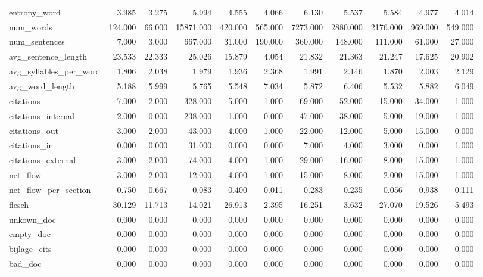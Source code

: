 \begin{tabular}{lrrrrrrrrrr}
\cline{1-11}
entropy\_word & 3.985 & 3.275 & 5.994 & 4.555 & 4.066 & 6.130 & 5.537 & 5.584 & 4.977 & 4.014 \\
\cline{1-11}
num\_words & 124.000 & 66.000 & 15871.000 & 420.000 & 565.000 & 7273.000 & 2880.000 & 2176.000 & 969.000 & 549.000 \\
\cline{1-11}
num\_sentences & 7.000 & 3.000 & 667.000 & 31.000 & 190.000 & 360.000 & 148.000 & 111.000 & 61.000 & 27.000 \\
\cline{1-11}
avg\_sentence\_length & 23.533 & 22.333 & 25.026 & 15.879 & 4.054 & 21.832 & 21.363 & 21.247 & 17.625 & 20.902 \\
\cline{1-11}
avg\_syllables\_per\_word & 1.806 & 2.038 & 1.979 & 1.936 & 2.368 & 1.991 & 2.146 & 1.870 & 2.003 & 2.129 \\
\cline{1-11}
avg\_word\_length & 5.188 & 5.999 & 5.765 & 5.548 & 7.034 & 5.872 & 6.406 & 5.532 & 5.882 & 6.049 \\
\cline{1-11}
citations & 7.000 & 2.000 & 328.000 & 5.000 & 1.000 & 69.000 & 52.000 & 15.000 & 34.000 & 1.000 \\
\cline{1-11}
citations\_internal & 2.000 & 0.000 & 238.000 & 1.000 & 0.000 & 47.000 & 38.000 & 5.000 & 19.000 & 1.000 \\
\cline{1-11}
citations\_out & 3.000 & 2.000 & 43.000 & 4.000 & 1.000 & 22.000 & 12.000 & 5.000 & 15.000 & 0.000 \\
\cline{1-11}
citations\_in & 0.000 & 0.000 & 31.000 & 0.000 & 0.000 & 7.000 & 4.000 & 3.000 & 0.000 & 1.000 \\
\cline{1-11}
citations\_external & 3.000 & 2.000 & 74.000 & 4.000 & 1.000 & 29.000 & 16.000 & 8.000 & 15.000 & 1.000 \\
\cline{1-11}
net\_flow & 3.000 & 2.000 & 12.000 & 4.000 & 1.000 & 15.000 & 8.000 & 2.000 & 15.000 & -1.000 \\
\cline{1-11}
net\_flow\_per\_section & 0.750 & 0.667 & 0.083 & 0.400 & 0.011 & 0.283 & 0.235 & 0.056 & 0.938 & -0.111 \\
\cline{1-11}
flesch & 30.129 & 11.713 & 14.021 & 26.913 & 2.395 & 16.251 & 3.632 & 27.070 & 19.526 & 5.493 \\
\cline{1-11}
unkown\_doc & 0.000 & 0.000 & 0.000 & 0.000 & 0.000 & 0.000 & 0.000 & 0.000 & 0.000 & 0.000 \\
\cline{1-11}
empty\_doc & 0.000 & 0.000 & 0.000 & 0.000 & 0.000 & 0.000 & 0.000 & 0.000 & 0.000 & 0.000 \\
\cline{1-11}
bijlage\_cits & 0.000 & 0.000 & 0.000 & 0.000 & 0.000 & 0.000 & 0.000 & 0.000 & 0.000 & 0.000 \\
\cline{1-11}
bad\_doc & 0.000 & 0.000 & 0.000 & 0.000 & 0.000 & 0.000 & 0.000 & 0.000 & 0.000 & 0.000 \\
\cline{1-11}
\bottomrule
\end{tabular}
